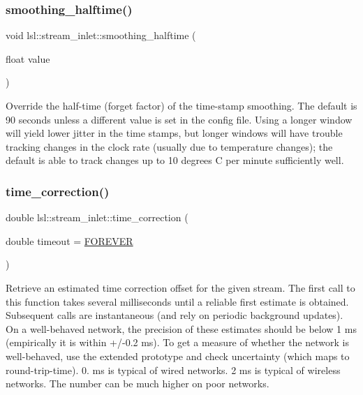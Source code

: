\subsubsection{\texorpdfstring{smoothing\+\_\+halftime()}{smoothing\_halftime()}}
{\footnotesize\ttfamily void lsl\+::stream\+\_\+inlet\+::smoothing\+\_\+halftime (\begin{DoxyParamCaption}\item[{float}]{value }\end{DoxyParamCaption})\hspace{0.3cm}{\ttfamily [inline]}}

Override the half-\/time (forget factor) of the time-\/stamp smoothing. The default is 90 seconds unless a different value is set in the config file. Using a longer window will yield lower jitter in the time stamps, but longer windows will have trouble tracking changes in the clock rate (usually due to temperature changes); the default is able to track changes up to 10 degrees C per minute sufficiently well. \mbox{\label{classlsl_1_1stream__inlet_a845d95f5fc60fb9cd01fb73d3da75e94}} 
\subsubsection{\texorpdfstring{time\+\_\+correction()}{time\_correction()}}
{\footnotesize\ttfamily double lsl\+::stream\+\_\+inlet\+::time\+\_\+correction (\begin{DoxyParamCaption}\item[{double}]{timeout = {\ttfamily \hyperlink{namespacelsl_a74cfbc9077aca21295117217249721ed}{F\+O\+R\+E\+V\+ER}} }\end{DoxyParamCaption})\hspace{0.3cm}{\ttfamily [inline]}}

Retrieve an estimated time correction offset for the given stream. The first call to this function takes several milliseconds until a reliable first estimate is obtained. Subsequent calls are instantaneous (and rely on periodic background updates). On a well-\/behaved network, the precision of these estimates should be below 1 ms (empirically it is within +/-\/0.2 ms). To get a measure of whether the network is well-\/behaved, use the extended prototype and check uncertainty (which maps to round-\/trip-\/time). 0. ms is typical of wired networks. 2 ms is typical of wireless networks. The number can be much higher on poor networks.


